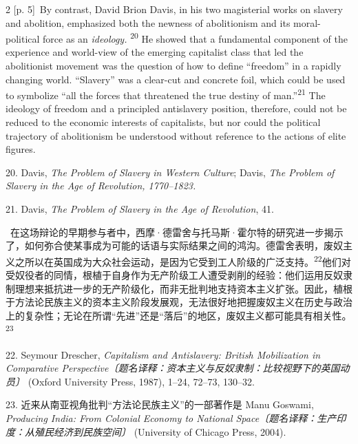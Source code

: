 \documentclass[10pt,a4paper]{article}
\begin{document}
\begin{paracol}{2}
{\scriptsize\color{gray} [p. 5]}\ By contrast, David Brion Davis, in his two magisterial works on slavery and abolition, emphasized both the newness of abolitionism and its moral-political force as an \textit{ideology.} \nobreak\textsuperscript{20} He showed that a fundamental component of the experience and world-view of the emerging capitalist class that led the abolitionist movement was the question of how to define “freedom” in a rapidly changing world. “Slavery” was a clear-cut and concrete foil, which could be used to symbolize “all the forces that threatened the true destiny of man.”\nobreak\textsuperscript{21} The ideology of freedom and a principled antislavery position, therefore, could not be reduced to the economic interests of capitalists, but nor could the political trajectory of abolitionism be understood without reference to the actions of elite figures.\par{\small 20. Davis, \textit{The Problem of Slavery in Western Culture}; Davis, \textit{The Problem of Slavery in the Age of Revolution, 1770–1823.}\par}{\small 21. Davis, \textit{The Problem of Slavery in the Age of Revolution}, 41.\par}
\switchcolumn*
{\scriptsize\color{gray} [p. 5]}\ 在这场辩论的早期参与者中，西摩·德雷舍与托马斯·霍尔特的研究进一步揭示了，如何弥合使某事成为可能的话语与实际结果之间的鸿沟。德雷舍表明，废奴主义之所以在英国成为大众社会运动，是因为它受到工人阶级的广泛支\mbox{持。\textsuperscript{22}}他们对受奴役者的同情，根植于自身作为无产阶级工人遭受剥削的经验：他们运用反奴隶制理想来抵抗进一步的无产阶级化，而非无批判地支持资本主义扩张。因此，植根于方法论民族主义的资本主义阶段发展观，无法很好地把握废奴主义在历史与政治上的复杂性；无论在所谓“先进”还是“落后”的地区，废奴主义都可能具有相关\mbox{性。\textsuperscript{23}}\par{\small 22. Seymour Drescher, \textit{Capitalism and Antislavery: British Mobilization in Comparative Perspective〔题名译释：资本主义与反奴隶制：比较视野下的英国动员〕} (Oxford University Press, 1987), 1–24, 72–73, 130–32.\par}{\small 23. 近来从南亚视角批判“方法论民族主义”的一部著作是 Manu Goswami, \textit{Producing India: From Colonial Economy to National Space〔题名译释：生产印度：从殖民经济到民族空间〕} (University of Chicago Press, 2004).\par}
\switchcolumn

\end{paracol}
\end{document}
